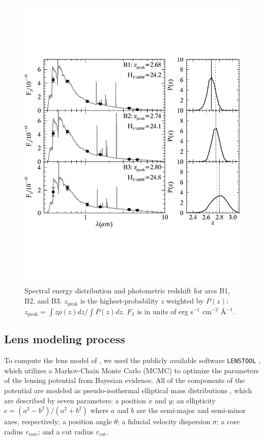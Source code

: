 \begin{figure}
\includegraphics[width=\textwidth,trim=0 150 0 150]{Chap4/c4f5.pdf}
\caption[SED and photometric redshift of arcs B1, B2, and B3]{Spectral energy distribution and photometric redshift for arcs B1, B2, and B3. $z_\mathrm{peak}$ is the highest-probability $z$ weighted by $P(z)$: $z_\mathrm{peak} = \int zp(z)dz/\int P(z) dz$. $F_\lambda$ is in units of erg s$^{-1}$ cm$^{-2}$ \AA$^{-1}$.}
\label{chap4:fig:photoz}
\end{figure}

\subsection{Lens modeling process}
To compute the lens model of \cluster, we used the publicly available software \texttt{LENSTOOL} \citep{Jullo:2007lr}, which utilizes a Markov-Chain Monte Carlo (MCMC) to optimize the parameters of the lensing potential from Bayesian evidence. All of the components of the potential are modeled as pseudo-isothermal elliptical mass distributions \citep[PIEMD;][]{Limousin:2005cr}, which are described by seven parameters: a position $x$ and $y$; an ellipticity $e=(a^2-b^2)/(a^2+b^2)$ where $a$ and $b$ are the semi-major and semi-minor axes, respectively; a position angle $\theta$; a fiducial velocity dispersion $\sigma$; a core radius $r_\mathrm{core}$; and a cut radius $r_\mathrm{cut}$.

